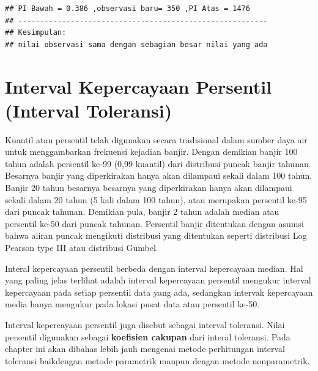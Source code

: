 \documentclass[]{book}
\newenvironment{Shaded}{\begin{snugshade}}{\end{snugshade}}
\newcommand{\KeywordTok}[1]{\textcolor[rgb]{0.13,0.29,0.53}{\textbf{#1}}}
\newcommand{\DataTypeTok}[1]{\textcolor[rgb]{0.13,0.29,0.53}{#1}}
\newcommand{\DecValTok}[1]{\textcolor[rgb]{0.00,0.00,0.81}{#1}}
\newcommand{\FloatTok}[1]{\textcolor[rgb]{0.00,0.00,0.81}{#1}}
\newcommand{\CommentTok}[1]{\textcolor[rgb]{0.56,0.35,0.01}{\textit{#1}}}
\newcommand{\OperatorTok}[1]{\textcolor[rgb]{0.81,0.36,0.00}{\textbf{#1}}}
\newcommand{\NormalTok}[1]{#1}
\begin{document}
\begin{Shaded}
\end{Shaded}

\begin{verbatim}
## PI Bawah = 0.386 ,observasi baru= 350 ,PI Atas = 1476
## ---------------------------------------------------------
## Kesimpulan:
## nilai observasi sama dengan sebagian besar nilai yang ada
\end{verbatim}

\section{Interval Kepercayaan Persentil (Interval
Toleransi)}\label{interval-kepercayaan-persentil-interval-toleransi}

Kuantil atau persentil telah digunakan secara tradisional dalam sumber
daya air untuk menggambarkan frekuensi kejadian banjir. Dengan demikian
banjir 100 tahun adalah persentil ke-99 (0,99 kuantil) dari distribusi
puncak banjir tahunan. Besarnya banjir yang diperkirakan hanya akan
dilampaui sekali dalam 100 tahun. Banjir 20 tahun besarnya besarnya yang
diperkirakan hanya akan dilampaui sekali dalam 20 tahun (5 kali dalam
100 tahun), atau merupakan persentil ke-95 dari puncak tahunan. Demikian
pula, banjir 2 tahun adalah median atau persentil ke-50 dari puncak
tahunan. Persentil banjir ditentukan dengan asumsi bahwa aliran puncak
mengikuti distribusi yang ditentukan seperti distribusi Log Pearson type
III atau distribusi Gumbel.

Interal kepercayaan persentil berbeda dengan interval kepercayaan
median. Hal yang paling jelas terlihat adalah interval kepercayaan
persentil mengukur interval kepercayaan pada setiap persentil data yang
ada, sedangkan intervak kepercayaan media hanya mengukur pada lokasi
pusat data atau persentil ke-50.

Interval kepercayaan persentil juga disebut sebagai interval toleransi.
Nilai persentil digunakan sebagai \textbf{koefisien cakupan} dari
interal toleransi. Pada chapter ini akan dibahas lebih jauh mengenai
metode perhitungan interval toleransi baikdengan metode parametrik
maupun dengan metode nonparametrik.
\end{document}

